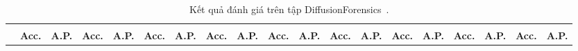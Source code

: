 \begin{table}[ht!]%
	\centering
	\caption{Kết quả đánh giá trên tập DiffusionForensics~\cite{Wang2023DIREFD}.}
	\label{tab:table3}
	\begin{adjustbox}{max width=\textwidth}
		\begin{tabular}{l cc cc cc cc cc cc cc cc|cc}
			\toprule
			 &  &  &  &  &  &  &  &  &  \\
			
			& \textbf{Acc.} & \textbf{A.P.} & \textbf{Acc.} & \textbf{A.P.} & \textbf{Acc.} & \textbf{A.P.} & \textbf{Acc.} & \textbf{A.P.} & \textbf{Acc.} & \textbf{A.P.} & \textbf{Acc.} & \textbf{A.P.} & \textbf{Acc.} & \textbf{A.P.} & \textbf{Acc.} & \textbf{A.P.} & \textbf{Acc.} & \textbf{A.P.} \\
			

\end{tabular}
\end{adjustbox}
\end{table}
